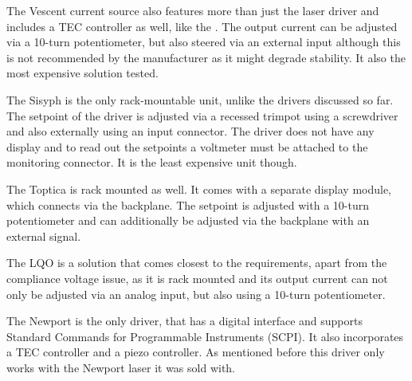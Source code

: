 The Vescent  current source also features more than just the laser driver and includes a TEC controller as well, like the . The output current can be adjusted via a 10-turn potentiometer, but also steered via an external input although this is not recommended by the manufacturer as it might degrade stability. It also the most expensive solution tested.

The Sisyph  is the only rack-mountable unit, unlike the drivers discussed so far. The setpoint of the driver is adjusted via a recessed trimpot using a screwdriver and also externally using an input connector. The driver does not have any display and to read out the setpoints a voltmeter must be attached to the monitoring connector. It is the least expensive unit though.

The Toptica  is rack mounted as well. It comes with a separate display module, which connects via the backplane. The setpoint is adjusted with a 10-turn potentiometer and can additionally be adjusted via the backplane with an external signal.

The LQO  is a solution that comes closest to the requirements, apart from the compliance voltage issue, as it is rack mounted and its output current can not only be adjusted via an analog input, but also using a 10-turn potentiometer.

The Newport  is the only driver, that has a digital interface and supports Standard Commands for Programmable Instruments (SCPI). It also incorporates a TEC controller and a piezo controller. As mentioned before this driver only works with the Newport  laser it was sold with.

